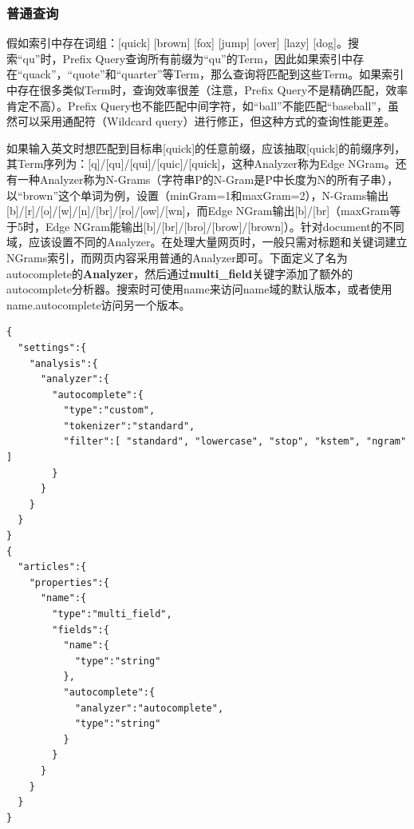 \subsubsection{普通查询}
\par 假如索引中存在词组：[quick] [brown] [fox] [jump] [over] [lazy] [dog]。搜索“qu”时，Prefix Query查询所有前缀为“qu”的Term，因此如果索引中存在“quack”，“quote”和“quarter”等Term，那么查询将匹配到这些Term。如果索引中存在很多类似Term时，查询效率很差（注意，Prefix Query不是精确匹配，效率肯定不高）。Prefix Query也不能匹配中间字符，如“ball”不能匹配“baseball”，虽然可以采用通配符（Wildcard query）进行修正，但这种方式的查询性能更差。
\par 如果输入英文时想匹配到目标串[quick]的任意前缀，应该抽取[quick]的前缀序列，其Term序列为：[q]/[qu]/[qui]/[quic]/[quick]，这种Analyzer称为Edge NGram。还有一种Analyzer称为N-Grams（字符串P的N-Gram是P中长度为N的所有子串），以“brown”这个单词为例，设置（minGram=1和maxGram=2），N-Grams输出[b]/[r]/[o]/[w]/[n]/[br]/[ro]/[ow]/[wn]，而Edge NGram输出[b]/[br]（maxGram等于5时，Edge NGram能输出[b]/[br]/[bro]/[brow]/[brown]）。针对document的不同域，应该设置不同的Analyzer。在处理大量网页时，一般只需对标题和关键词建立NGrams索引，而网页内容采用普通的Analyzer即可。下面定义了名为autocomplete的\textbf{Analyzer}，然后通过\textbf{multi\_field}关键字添加了额外的autocomplete分析器。搜索时可使用name来访问name域的默认版本，或者使用name.autocomplete访问另一个版本。
\begin{verbatim}
{
  "settings":{
    "analysis":{
      "analyzer":{
        "autocomplete":{
          "type":"custom",
          "tokenizer":"standard",
          "filter":[ "standard", "lowercase", "stop", "kstem", "ngram" ] 
        }
      }
    }
  }
}
{
  "articles":{
    "properties":{
      "name":{
        "type":"multi_field",
        "fields":{
          "name":{
            "type":"string"
          },
          "autocomplete":{
            "analyzer":"autocomplete",
            "type":"string"
          }
        }
      }
    }
  }
}
\end{verbatim}

